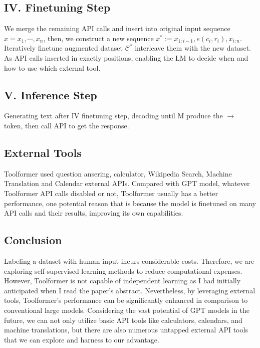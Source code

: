 \documentclass[12pt]{article}
\newcounter{question}
\begin{document}
\subsection*{IV. Finetuning Step}
We merge the remaining API calls and insert into original input sequence $x = x_1, \cdots, x_n$, then, we construct a new sequence $x^* := x_{1:i-1}, e(c_i, r_i), x_{i:n}$. \\
Iteratively finetune augmented dataset $\mathcal{C}^*$
 interleave them with the new dataset. As API calls inserted in exactly positions, enabling the LM to decide when and how to use which external tool.
 
\subsection*{V. Inference Step}
Generating text after IV finetuning step, decoding until M produce the $\rightarrow$ token, then call API to get the response.

\subsection*{External Tools}
Toolformer used question ansering, calculator, Wikipedia Search, Machine Translation and Calendar external APIs. Compared with GPT model, whatever Toolformer API calls disabled or not, Toolformer usually has a better performance, one potential reason that is because the model is finetuned on many API calls and their results, improving its own capabilities.

\subsection*{Conclusion}
Labeling a dataset with human input incurs considerable costs. Therefore, we are exploring self-supervised learning methods to reduce computational expenses. However, Toolformer is not capable of independent learning as I had initially anticipated when I read the paper's abstract. Nevertheless, by leveraging external tools, Toolformer's performance can be significantly enhanced in comparison to conventional large models. Considering the vast potential of GPT models in the future, we can not only utilize basic API tools like calculators, calendars, and machine translations, but there are also numerous untapped external API tools that we can explore and harness to our advantage.
\end{document}
